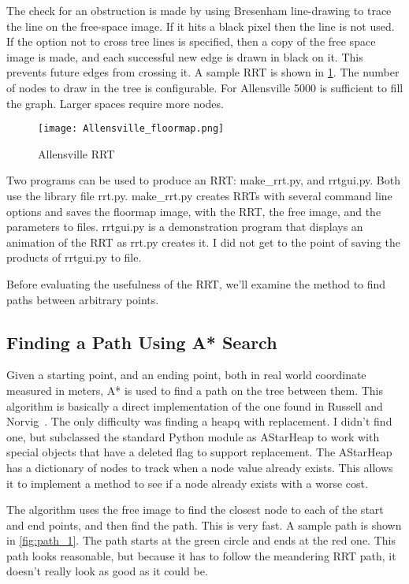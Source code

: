 \documentclass[10pt,twocolumn,letterpaper]{article}
\begin{document}
The check for an obstruction is made by using Bresenham line-drawing
to trace the line on the free-space image. If it hits a black pixel
then the line is not used. If the option not to cross tree lines is
specified, then a copy of the free space image is made, and each
successful new edge is drawn in black on it. This prevents future
edges from crossing it.  A sample RRT is shown in
\ref{fig:floormap}. The number of nodes to draw in the tree is
configurable. For Allensville 5000 is sufficient to fill the
graph. Larger spaces require more nodes.

\begin{centering}
\begin{figure}[ht]
\caption{Allensville RRT} \centering
\texttt{[image: Allensville\_floormap.png]}
\label{fig:floormap}
\end{figure}
\end{centering}

Two programs can be used to produce an RRT: make\_rrt.py, and
rrtgui.py. Both use the library file rrt.py. make\_rrt.py creates RRTs
with several command line options and saves the floormap image, with
the RRT, the free image, and the parameters to files. rrtgui.py is a
demonstration program that displays an animation of the RRT as rrt.py
creates it. I did not get to the point of saving the products of
rrtgui.py to file.

Before evaluating the usefulness of the RRT, we'll examine the method
to find paths between arbitrary points.

\subsection{Finding a Path Using A* Search}

Given a starting point, and an ending point, both in real world
coordinate measured in meters, A* is used to find a path on the tree
between them. This algorithm is basically a direct implementation of
the one found in Russell and
Norvig~\cite{Russell:2009:AIM:1671238}. The only difficulty was
finding a heapq with replacement. I didn't find one, but subclassed
the standard Python module as AStarHeap to work with special objects
that have a deleted flag to support replacement. The AStarHeap has a
dictionary of nodes to track when a node value already exists. This
allows it to implement a method to see if a node already exists with
a worse cost.

The algorithm uses the free image to find the closest node to each
of the start and end points, and then find the path. This is very
fast. A sample path is shown in \ref{fig:path_1}. The path starts at
the green circle and ends at the red one. This path looks reasonable,
but because it has to follow the meandering RRT path, it doesn't
really look as good as it could be. 
\end{document}
